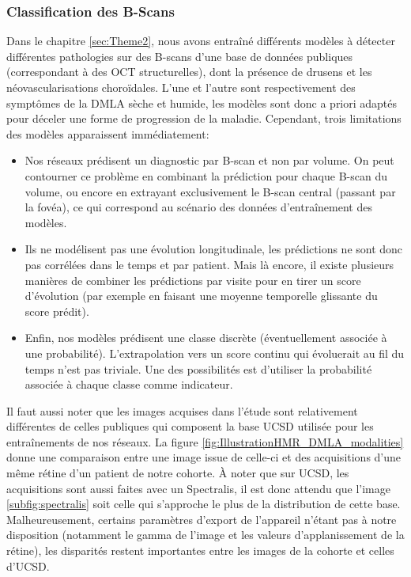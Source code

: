 \subsubsection{Classification des B-Scans}
Dans le chapitre \ref{sec:Theme2}, nous avons entraîné différents modèles à détecter différentes pathologies sur des B-scans d'une base de données publiques (correspondant à des OCT structurelles), dont la présence de drusens et les néovascularisations choroïdales. L'une et l'autre sont respectivement des symptômes de la DMLA sèche et humide, les modèles sont donc a priori adaptés pour déceler une forme de progression de la maladie. Cependant, trois limitations des modèles apparaissent immédiatement:
\begin{itemize}
	\item Nos réseaux prédisent un diagnostic par B-scan et non par volume. On peut contourner ce problème en combinant la prédiction pour chaque B-scan du volume, ou encore en extrayant exclusivement le B-scan central (passant par la fovéa), ce qui correspond au scénario des données d'entraînement des modèles.
	\item Ils ne modélisent pas une évolution longitudinale, les prédictions ne sont donc pas corrélées dans le temps et par patient. Mais là encore, il existe plusieurs manières de combiner les prédictions par visite pour en tirer un score d'évolution (par exemple en faisant une moyenne temporelle glissante du score prédit).
	\item Enfin, nos modèles prédisent une classe discrète (éventuellement associée à une probabilité). L'extrapolation vers un score continu qui évoluerait au fil du temps n'est pas triviale. Une des possibilités est d'utiliser la probabilité associée à chaque classe comme indicateur.
\end{itemize}
Il faut aussi noter que les images acquises dans l'étude sont relativement différentes de celles publiques qui composent la base UCSD \cite{kermanyIdentifyingMedicalDiagnoses2018} utilisée pour les entraînements de nos réseaux. La figure \ref{fig:IllustrationHMR_DMLA_modalities} donne une comparaison entre une image issue de celle-ci et des acquisitions d'une même rétine d'un patient de notre cohorte. À noter que sur UCSD, les acquisitions sont aussi faites avec un Spectralis, il est donc attendu que l'image \ref{subfig:spectralis} soit celle qui s'approche le plus de la distribution de cette base. Malheureusement, certains paramètres d'export de l'appareil n'étant pas à notre disposition (notamment le gamma de l'image et les valeurs d'applanissement de la rétine), les disparités restent importantes entre les images de la cohorte et celles d'UCSD.
